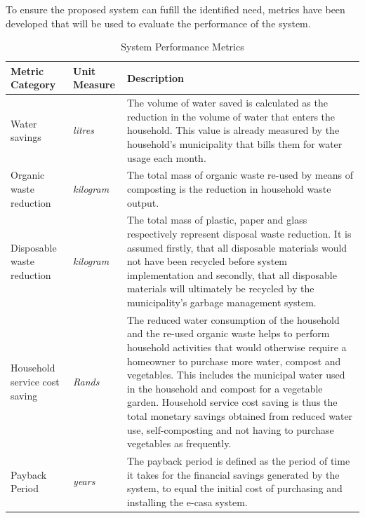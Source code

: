 \documentclass[a4paper,11pt,fleqn]{report}
\begin{document}
To ensure the proposed system can fufill the identified need, metrics have been developed that will be used to evaluate the performance of the system.
%
\begin{table}[h!]
\caption {System Performance Metrics} \label{tb: Performance_Metrics} 
\begin{center}
\begin{tabular}{p{5cm}|p{3cm}|p{8cm}}\toprule
	{\textbf{Metric Category}} & {\textbf{Unit Measure}} & {\textbf{Description}}\\ \midrule
    Water savings & \textit{litres} & The volume of water saved is calculated as the reduction in the volume of water that enters the household. This value is already measured by the household's municipality that bills them for water usage each month.\\
    \hline
    Organic waste reduction & \textit{kilogram} & The total mass of organic waste re-used by means of composting is the reduction in household waste output.\\
    \hline
    Disposable waste reduction & \textit{kilogram} & The total mass of plastic, paper and glass respectively represent disposal waste reduction. It is assumed firstly, that all disposable materials would not have been recycled before system implementation and secondly, that all disposable materials will ultimately be recycled by the municipality's garbage management system.\\
    \hline
    Household service cost saving & \textit{Rands} & The reduced water consumption of the household and the re-used organic waste helps to perform household activities that would otherwise require a homeowner to purchase more water, compost and vegetables. This includes the municipal water used in the household and compost for a vegetable garden. Household service cost saving is thus the total monetary savings obtained from reduced water use, self-composting and not having to purchase vegetables as frequently.\\
    \hline
    Payback Period & \textit{years} & The payback period is defined as the period of time it takes for the financial savings generated by the system, to equal the initial cost of purchasing and installing the \ac{e-casa} system. \\ \bottomrule
\end{tabular}
\end{center}
\end{table}
%
\end{document}
